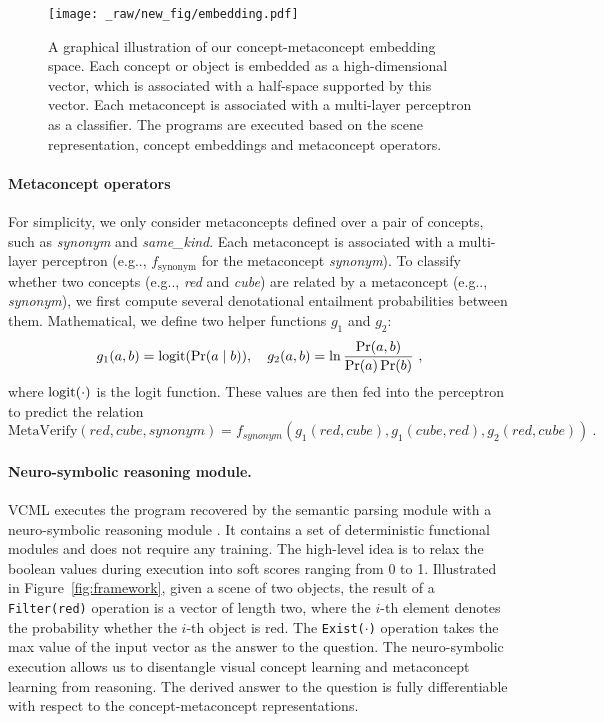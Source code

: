 \documentclass{article}
\makeatletter
\newcommand{\fig}[1]{Figure~\ref{#1}}
\DeclareRobustCommand\onedot{\futurelet\@let@token\@onedot}
\def\@onedot{\ifx\@let@token.\else.\null\fi\xspace}
\def\eg{e.g\onedot} \def\Eg{E.g\onedot}
\newcommand{\model}{VCML\xspace}
\newcommand{\myparagraph}[1]{\vspace{-10pt}\paragraph{#1}}
\makeatother
\begin{document}
\begin{figure}[t!]
    \centering
    \texttt{[image: \_raw/new\_fig/embedding.pdf]}
    \caption{A graphical illustration of our concept-metaconcept embedding space.
Each concept or object is embedded as a high-dimensional vector, which is associated with a half-space supported by this vector. Each metaconcept is associated with a multi-layer perceptron as a classifier.
    The programs are executed based on the scene representation, concept embeddings and metaconcept operators.}
    \label{fig:embedding-space}
    \vspace{-1em}
\end{figure} 
\myparagraph{Metaconcept operators}
For simplicity, we only consider metaconcepts defined over a pair of concepts, such as {\it synonym} and {\it same\_kind}. Each metaconcept is associated with a multi-layer perceptron (\eg, $f_\text{synonym}$ for the metaconcept {\it synonym}). To classify whether two concepts (\eg, {\it red} and {\it cube}) are related by a metaconcept (\eg, {\it synonym}), we first compute several denotational entailment probabilities between them. Mathematical, we define two helper functions $g_1$ and $g_2$:
\[
    g_1(a,b) = \textnormal{logit} (\Pr(a \mid b)),\quad
    g_2(a,b) = \ln{\frac{\Pr(a, b)}{\Pr(a)\Pr(b)}}~,
\]
where $\textnormal{logit}(\cdot)$ is the logit function. These values are then fed into the perceptron to predict the relation
\[
    \text{MetaVerify}(\mathit{red}, cube, synonym) = f_{synonym}(g_1(red, cube), g_1(cube, red), g_2(red, cube))~.
\]







\paragraph{Neuro-symbolic reasoning module.}
\model executes the program recovered by the semantic parsing module with a neuro-symbolic reasoning module \citep{Mao2019NeuroSymbolic}. It contains a set of deterministic functional modules and does not require any training. The high-level idea is to relax the boolean values during execution into soft scores ranging from 0 to 1. Illustrated in \fig{fig:framework}, given a scene of two objects, the result of a {\tt Filter(red)} operation is a vector of length two, where the $i$-th element denotes the probability whether the $i$-th object is red. The {\tt Exist($\cdot$)} operation takes the max value of the input vector as the answer to the question. The neuro-symbolic execution allows us to disentangle visual concept learning and metaconcept learning from reasoning. The derived answer to the question is fully differentiable with respect to the concept-metaconcept representations.
\end{document}
